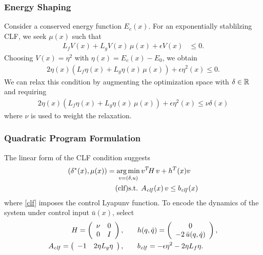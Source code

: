 \documentclass{beamer}
\DeclareMathOperator*{\argmin}{arg\,min}
\begin{document}
\begin{frame}
  \frametitle{Energy Shaping}
  Consider a conserved energy function $E_{c}(x)$. For an exponentially stablilzing CLF, we seek $\mu(x)$ such that
  \begin{align*}
    L_f V(x) + L_g V(x) \, \mu(x) + \epsilon V(x) &\leq 0.
  \end{align*}
  Choosing $V(x) = \eta^2$ with $\eta(x) = E_{c}(x) - E_{0}$, we obtain
  \begin{align*}
    2 \eta(x) \left(L_f \eta(x) + L_g \eta(x) \, \mu(x) \right) + \epsilon \eta^2(x) \leq 0.
  \end{align*}
  We can relax this condition by augmenting the optimization space with $\delta \in \mathbb{R}$ and requiring
  \begin{align*}
    2 \eta(x) \left(L_f \eta(x) + L_g \eta(x) \, \mu(x) \right) + \epsilon \eta^2(x) \leq \nu \delta(x)
  \end{align*}
  where $\nu$ is used to weight the relaxation.
\end{frame}

\begin{frame}[t]
  \frametitle{Quadratic Program Formulation}
  The linear form of the CLF condition suggests
  \begin{align}
    \nonumber
    (\delta^*(x), \mu(x)) = \argmin_{v = (\delta, u)}  \, & v^T \! H \, v + h^T(x) v\\
    \label{clf} \tag{clf}
    \mbox{s.t. } & \Aclf(x) \, v \leq \bclf(x)%
  \end{align}
  where \eqref{clf} imposes the control Lyapunv function. To encode the dynamics of the system under control input ${\bar u}(x)$, select
  \begin{align*}
    H = \left(\begin{array}{c c}\nu & 0\\ 0 & I\end{array}\right), & \qquad
      h(q, \dot q) = \left(\begin{array}{c} 0\\ -2 \, \bar u(q, \dot q) \end{array}\right),\\
      A_{\mathit{clf}} = \left(\begin{array}{c c}
        -1 & 2 \eta L_{g} \eta
      \end{array}\right), & \qquad
      b_{\mathit{clf}} = -\epsilon \eta^{2} - 2\eta L_{f} \eta.
  \end{align*}
\end{frame}
\end{document}

